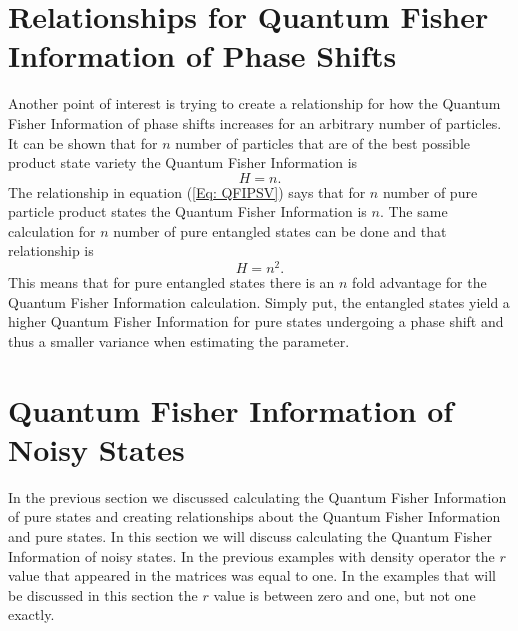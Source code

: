 \documentclass[twocolumn]{article}
\begin{document}
\section*{Relationships for Quantum Fisher Information of Phase Shifts}
Another point of interest is trying to create a relationship for how the Quantum Fisher Information of phase shifts increases for an arbitrary number of particles. It can be shown that for $n$ number of particles that are of the best possible product state variety the Quantum Fisher Information is
\begin{equation} \label{Eq: QFIPSV}
H=n.
\end{equation}
The relationship in equation (\ref{Eq: QFIPSV}) says that for $n$ number of pure particle product states the Quantum Fisher Information is $n$. The same calculation for $n$ number of pure entangled states can be done and that relationship is
\begin{equation} \label{Eq: QFIPSVS}
H=n^2.
\end{equation}
This means that for pure entangled states there is an $n$ fold advantage for the Quantum Fisher Information calculation. Simply put, the entangled states yield a higher Quantum Fisher Information for pure states undergoing a phase shift and thus a smaller variance when estimating the parameter.
\section*{Quantum Fisher Information of Noisy States}
In the previous section we discussed calculating the Quantum Fisher Information of pure states and creating relationships about the Quantum Fisher Information and pure states. In this section we will discuss calculating the Quantum Fisher Information of noisy states. In the previous examples with density operator the $r$ value that appeared in the matrices was equal to one. In the examples that will be discussed in this section the $r$ value is between zero and one, but not one exactly.
\end{document}
